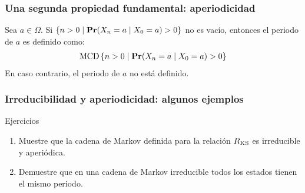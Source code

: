 \begin{frame}
\frametitle{Una segunda propiedad fundamental: aperiodicidad}


{\small

Sea $a \in \Omega$. Si $\{ n > 0 \mid {\rm {\bf Pr}}(X_n = a \mid X_0 = a) > 0\}$ no es vacío, entonces el periodo de $a$ es definido como:
\begin{eqnarray*}
\text{MCD}\,\{ n > 0 \mid {\rm {\bf Pr}}(X_n = a \mid X_0 = a) > 0\}
\end{eqnarray*}
En caso contrario, el periodo de $a$ no está definido. 



}



\end{frame}


\begin{frame}
\frametitle{Irreducibilidad y aperiodicidad: algunos ejemplos}

{\small

\begin{exampleblock}{Ejercicios}
\begin{enumerate}
\item Muestre que la cadena de Markov definida para la relación $R_{\text{KS}}$ es irreducible y aperiódica.


\item Demuestre que en una cadena de Markov irreducible todos los estados tienen el mismo periodo.
\end{enumerate}
\end{exampleblock}

}

\end{frame}


